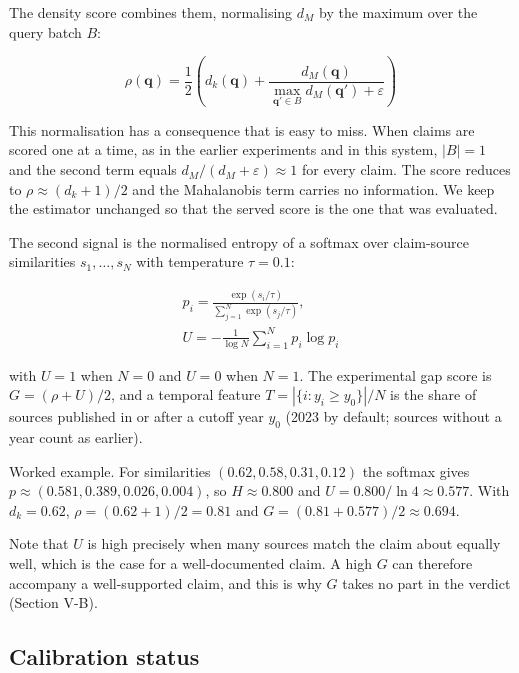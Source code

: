 \documentclass[conference]{IEEEtran}
\begin{document}
The density score combines them, normalising $d_M$ by the maximum over the query batch $B$:

\begin{equation}
\rho(\mathbf{q}) = \frac{1}{2}\left(d_k(\mathbf{q}) + \frac{d_M(\mathbf{q})}{\max_{\mathbf{q}' \in B} d_M(\mathbf{q}') + \varepsilon}\right)
\end{equation}

This normalisation has a consequence that is easy to miss. When claims are scored one at a time, as in the earlier experiments and in this system, $|B|=1$ and the second term equals $d_M/(d_M+\varepsilon) \approx 1$ for every claim. The score reduces to $\rho \approx (d_k+1)/2$ and the Mahalanobis term carries no information. We keep the estimator unchanged so that the served score is the one that was evaluated.

The second signal is the normalised entropy of a softmax over claim-source similarities $s_1,\dots,s_N$ with temperature $\tau = 0.1$:

\begin{equation}
\begin{aligned}
p_i = \frac{\exp(s_i/\tau)}{\sum_{j=1}^{N}\exp(s_j/\tau)}, \\
U = -\frac{1}{\log N}\sum_{i=1}^{N} p_i \log p_i
\end{aligned}
\end{equation}

with $U=1$ when $N=0$ and $U=0$ when $N=1$. The experimental gap score is $G = (\rho + U)/2$, and a temporal feature $T = |\{i : y_i \ge y_0\}|/N$ is the share of sources published in or after a cutoff year $y_0$ (2023 by default; sources without a year count as earlier).

Worked example. For similarities $(0.62, 0.58, 0.31, 0.12)$ the softmax gives $p \approx (0.581, 0.389, 0.026, 0.004)$, so $H \approx 0.800$ and $U = 0.800/\ln 4 \approx 0.577$. With $d_k = 0.62$, $\rho = (0.62+1)/2 = 0.81$ and $G = (0.81+0.577)/2 \approx 0.694$.

Note that $U$ is high precisely when many sources match the claim about equally well, which is the case for a well-documented claim. A high $G$ can therefore accompany a well-supported claim, and this is why $G$ takes no part in the verdict (Section V-B).

\subsection{Calibration status}
\end{document}
